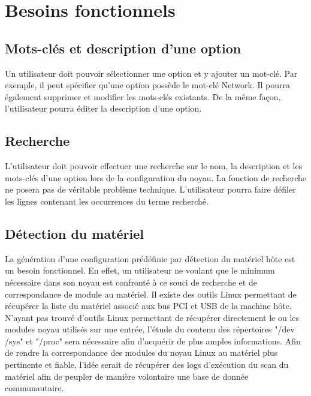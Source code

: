 \documentclass[16pts]{report}
\begin{document}

\nocite{*}

\chapter{Besoins fonctionnels}
\label{cha:Besoins fonctionnels}


\section{Mots-clés et description d'une option}
\label{sec:Mots-clés et description d'une option}

Un utilisateur doit pouvoir sélectionner une option et y ajouter un mot-clé.
Par exemple, il peut spécifier qu'une option possède le mot-clé Network. Il
pourra également supprimer et modifier les mots-clés existants. De la même
façon, l'utilisateur pourra éditer la description d'une option.

\section{Recherche}
\label{sec:Recherche}

L'utilisateur doit pouvoir effectuer une recherche sur le nom, la description
et les mots-clés d'une option lors de la configuration du noyau. La fonction de
recherche ne posera pas de véritable problème technique. L'utilisateur pourra
faire défiler les lignes contenant les occurrences du terme recherché.

\section{Détection du matériel}
\label{sec:Détection du matériel}

La génération d'une configuration prédéfinie par détection du matériel hôte est
un besoin fonctionnel. En effet, un utilisateur ne voulant que le minimum
nécessaire dans son noyau est confronté à ce souci de recherche et de
correspondance de module au matériel.
Il existe des outils Linux permettant de récupérer la liste du matériel associé
aux bus PCI et USB de la machine hôte.
N'ayant pas trouvé d'outils Linux permettant de récupérer directement le ou les
modules noyau utilisés sur une entrée, l'étude du contenu des répertoires "/dev
/sys" et "/proc" sera nécessaire afin d'acquérir de plus amples informations.
Afin de rendre la correspondance des modules du noyau Linux au matériel plus
pertinente et fiable, l'idée serait de récupérer des logs d'exécution du scan
du matériel afin de peupler de manière volontaire une base de donnée
communautaire.
\end{document}
